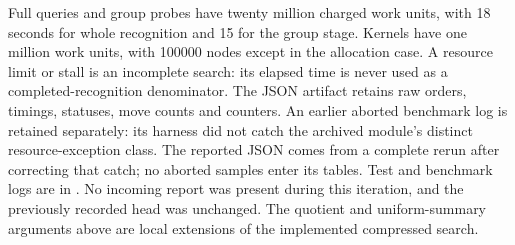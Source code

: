 Full queries and group probes have twenty million charged work units,
with 18 seconds for whole recognition and 15 for the group stage. Kernels
have one million work units, with 100000 nodes except in the allocation
case. A resource limit or stall is an incomplete search: its elapsed time
is never used as a completed-recognition denominator. The JSON artifact
 retains raw orders, timings,
statuses, move counts and counters. An earlier aborted benchmark log is
retained separately: its harness did not catch the archived module's distinct
resource-exception class. The reported JSON comes from a complete rerun
after correcting that catch; no aborted samples enter its tables.
Test and benchmark logs are in
. No incoming report was present during
this iteration, and the previously recorded  head was
unchanged. The quotient and uniform-summary arguments above are local
extensions of the implemented compressed search.
